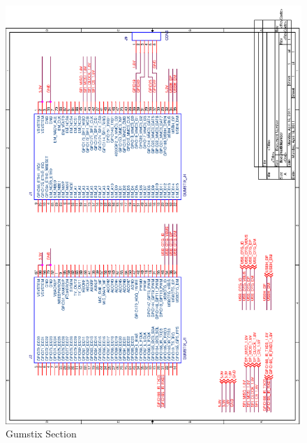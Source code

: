 \documentclass[11pt]{report} %
\begin{document}
	\begin{figure}[H]
		\centering
		\includegraphics[scale=0.50]{images/final_gumstix.png}
		\caption{Gumstix Section}\label{fig:finalgumstix_board}
	\end{figure}
\end{document}
